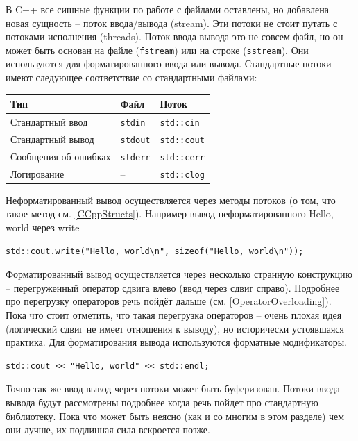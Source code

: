\documentclass[a4paper,12pt,oneside]{article}
\begin{document}
В C++ все сишные функции по работе с файлами оставлены, но добавлена новая сущность -- поток ввода/вывода (stream). Эти потоки не стоит путать с потоками исполнения (threads). Поток ввода вывода это не совсем файл, но он может быть основан на файле (\lstinline!fstream!) или на строке (\lstinline!sstream!). Они используются для форматированного ввода или вывода. Стандартные потоки имеют следующее соответствие со стандартными файлами:

\begin{center}
\begin{tabular}{ | l | l | l | }
  \hline
  Тип & Файл & Поток \\ \hline
  Стандартный ввод & \lstinline!stdin! & \lstinline!std::cin! \\
  Стандартный вывод & \lstinline!stdout! & \lstinline!std::cout! \\
  Сообщения об ошибках & \lstinline!stderr! & \lstinline!std::cerr! \\
  Логирование & -- & \lstinline!std::clog! \\
  \hline
\end{tabular}
\end{center}

Неформатированный вывод осуществляется через методы потоков (о том, что такое метод см. \ref{CCppStructs}). Например вывод неформатированного Hello, world через write

\begin{lstlisting}
std::cout.write("Hello, world\n", sizeof("Hello, world\n"));
\end{lstlisting}

Форматированный вывод осуществляется через несколько странную конструкцию -- перегруженный оператор сдвига влево (ввод через сдвиг справо). Подробнее про перегрузку операторов речь пойдёт дальше (см. \ref{OperatorOverloading}). Пока что стоит отметить, что такая перегрузка операторов -- очень плохая идея (логический сдвиг не имеет отношения к выводу), но исторически устоявшаяся практика. Для форматирования вывода используются форматные модификаторы.

\begin{lstlisting}
std::cout << "Hello, world" << std::endl;
\end{lstlisting}

Точно так же ввод вывод через потоки может быть буферизован. Потоки ввода-вывода будут рассмотрены подробнее когда речь пойдет про стандартную библиотеку. Пока что может быть неясно (как и со многим в этом разделе) чем они лучше, их подлинная сила вскроется позже.
\end{document}
